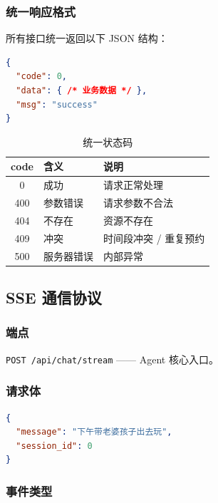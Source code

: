 \documentclass[12pt,a4paper]{ctexart}
\begin{document}
\subsubsection{统一响应格式}

所有接口统一返回以下 JSON 结构：

\begin{lstlisting}[language=json]
{
  "code": 0,
  "data": { /* 业务数据 */ },
  "msg": "success"
}
\end{lstlisting}

\begin{table}[ht]
\centering
\begin{tabular}{cll}
\toprule
\textbf{code} & \textbf{含义} & \textbf{说明} \\
\midrule
0   & 成功   & 请求正常处理 \\
400 & 参数错误 & 请求参数不合法 \\
404 & 不存在 & 资源不存在 \\
409 & 冲突   & 时间段冲突 / 重复预约 \\
500 & 服务器错误 & 内部异常 \\
\bottomrule
\end{tabular}
\caption{统一状态码}
\label{tab:status-codes}
\end{table}

\subsection{SSE 通信协议}

\subsubsection{端点}

\texttt{POST /api/chat/stream} —— Agent 核心入口。

\subsubsection{请求体}

\begin{lstlisting}[language=json]
{
  "message": "下午带老婆孩子出去玩",
  "session_id": 0
}
\end{lstlisting}

\subsubsection{事件类型}
\end{document}
